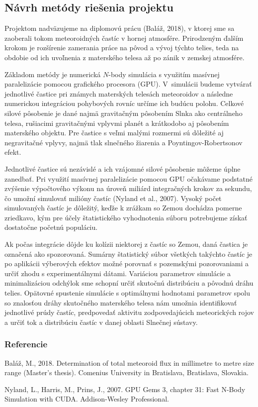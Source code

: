 \subsection{Návrh metódy riešenia
projektu}\label{nuxe1vrh-metuxf3dy-rieux161enia-projektu}

Projektom nadväzujeme na diplomovú prácu (Baláž, 2018), v ktorej sme sa
zaoberali tokom meteoroidných častíc v hornej atmosfére. Prirodzeným
ďalším krokom je rozšírenie zamerania práce na pôvod a vývoj týchto
telies, teda na obdobie od ich uvoľnenia z materského telesa až po zánik
v zemskej atmosfére.

Základom metódy je numerická \(N\)-body simulácia s využitím masívnej
paralelizácie pomocou grafického procesora (GPU). V~simulácii budeme
vytvárať jednotlivé častice pri známych materských telesách meteoroidov
a následne numerickou integráciou pohybových rovníc určíme ich budúcu
polohu. Celkové silové pôsobenie je dané najmä gravitačným pôsobením
Slnka ako centrálneho telesa, rušiacimi gravitačnými vplyvmi planét a
krátkodobo aj pôsobením materského objektu. Pre častice s veľmi malými
rozmermi sú dôležité aj negravitačné vplyvy, najmä tlak slnečného
žiarenia a Poyntingov-Robertsonov efekt.

Jednotlivé častice sú nezávislé a ich vzájomné silové pôsobenie môžeme
úplne zanedbať. Pri využití masívnej paralelizácie pomocou GPU očakávame
podstatné zvýšenie výpočtového výkonu na úroveň miliárd integračných
krokov za sekundu, čo umožní simulovať milióny častíc (Nyland et al.,
2007). Vysoký počet simulovaných častíc je dôležitý, keďže k zrážkam so
Zemou dochádza pomerne zriedkavo, kým pre účely štatistického
vyhodnotenia súboru potrebujeme získať dostatočne početnú populáciu.

Ak počas integrácie dôjde ku kolízii niektorej z častíc so Zemou, daná
častica je označená ako spozorovaná. Sumárny štatistický súbor všetkých
takýchto častíc je po aplikácii výberových efektov možné porovnať s
pozemskými pozorovaniami a určiť zhodu s experimentálnymi dátami.
Variáciou parametrov simulácie a minimalizáciou odchýlok sme schopní
určiť skutočnú distribúciu a pôvodnú dráhu telies. Opätovné spustenie
simulácie s optimálnymi hodnotami parametrov spolu so znalosťou dráhy
skutočného materského telesa nám umožnia identifikovať jednotlivé prúdy
častíc, predpovedať aktivitu zodpovedajúcich meteorických rojov a určiť
tok a distribúciu častíc v danej oblasti Slnečnej sústavy.

\subsubsection*{Referencie}\label{referencie}

\hypertarget{refs}{}
\hypertarget{ref-balaz2018}{}
Baláž, M., 2018. Determination of total meteoroid flux in millimetre to
metre size range (Master's thesis). Comenius University in Bratislava,
Bratislava, Slovakia.

\hypertarget{ref-nyland2007}{}
Nyland, L., Harris, M., Prins, J., 2007. GPU Gems 3, chapter 31: Fast
N-Body Simulation with CUDA. Addison-Wesley Professional.
